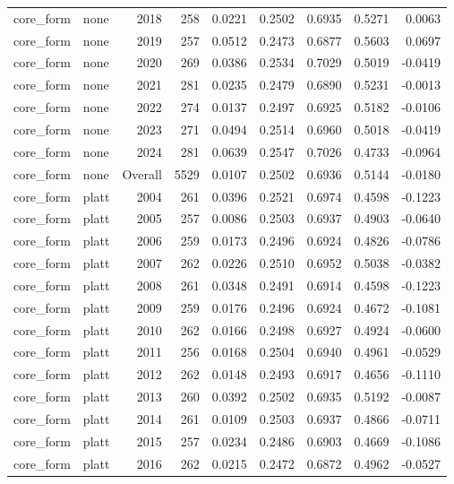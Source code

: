 \begin{table}[t]
\begin{tabular}{@{} l l r r r r r r r @{} }
      core\_form & none & 2018 & 258 & 0.0221 & 0.2502 & 0.6935 & 0.5271 & 0.0063 \\
      core\_form & none & 2019 & 257 & 0.0512 & 0.2473 & 0.6877 & 0.5603 & 0.0697 \\
      core\_form & none & 2020 & 269 & 0.0386 & 0.2534 & 0.7029 & 0.5019 & -0.0419 \\
      core\_form & none & 2021 & 281 & 0.0235 & 0.2479 & 0.6890 & 0.5231 & -0.0013 \\
      core\_form & none & 2022 & 274 & 0.0137 & 0.2497 & 0.6925 & 0.5182 & -0.0106 \\
      core\_form & none & 2023 & 271 & 0.0494 & 0.2514 & 0.6960 & 0.5018 & -0.0419 \\
      core\_form & none & 2024 & 281 & 0.0639 & 0.2547 & 0.7026 & 0.4733 & -0.0964 \\
      core\_form & none & Overall & 5529 & 0.0107 & 0.2502 & 0.6936 & 0.5144 & -0.0180 \\
      core\_form & platt & 2004 & 261 & 0.0396 & 0.2521 & 0.6974 & 0.4598 & -0.1223 \\
      core\_form & platt & 2005 & 257 & 0.0086 & 0.2503 & 0.6937 & 0.4903 & -0.0640 \\
      core\_form & platt & 2006 & 259 & 0.0173 & 0.2496 & 0.6924 & 0.4826 & -0.0786 \\
      core\_form & platt & 2007 & 262 & 0.0226 & 0.2510 & 0.6952 & 0.5038 & -0.0382 \\
      core\_form & platt & 2008 & 261 & 0.0348 & 0.2491 & 0.6914 & 0.4598 & -0.1223 \\
      core\_form & platt & 2009 & 259 & 0.0176 & 0.2496 & 0.6924 & 0.4672 & -0.1081 \\
      core\_form & platt & 2010 & 262 & 0.0166 & 0.2498 & 0.6927 & 0.4924 & -0.0600 \\
      core\_form & platt & 2011 & 256 & 0.0168 & 0.2504 & 0.6940 & 0.4961 & -0.0529 \\
      core\_form & platt & 2012 & 262 & 0.0148 & 0.2493 & 0.6917 & 0.4656 & -0.1110 \\
      core\_form & platt & 2013 & 260 & 0.0392 & 0.2502 & 0.6935 & 0.5192 & -0.0087 \\
      core\_form & platt & 2014 & 261 & 0.0109 & 0.2503 & 0.6937 & 0.4866 & -0.0711 \\
      core\_form & platt & 2015 & 257 & 0.0234 & 0.2486 & 0.6903 & 0.4669 & -0.1086 \\
      core\_form & platt & 2016 & 262 & 0.0215 & 0.2472 & 0.6872 & 0.4962 & -0.0527 \\

\end{tabular}
\end{table}

